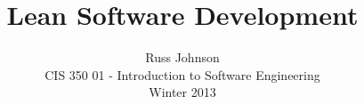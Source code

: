 \documentclass[11pt,a4paper]{article}
\title{Lean Software Development}
\author{Russ Johnson\\
CIS 350 01 - Introduction to Software Engineering\\
Winter 2013\\
}
\begin{document}
\maketitle
\nocite{qed_re}
\nocite{qed_re} %
\nocite{megill} %
\nocite{huth} %
\nocite{gonthier} %





\end{document}
